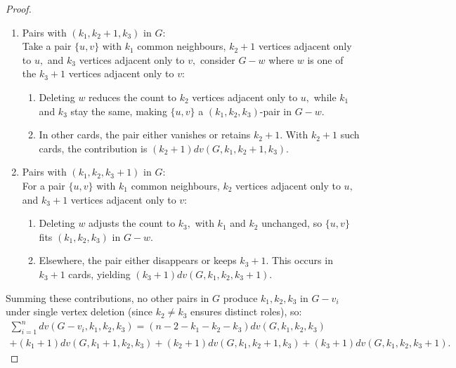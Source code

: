 \documentclass[11pt,oneside]{article}
\theoremstyle{definition}
\begin{document}
\begin{proof}
\begin{enumerate}
\item[(3)] Pairs with $(k_1,k_2+1,k_3)$ in $G$:\\
Take a pair $\{u,v\}$ with $k_1$ common neighbours, $k_2+1$ vertices adjacent only to $u,$ and $k_3$ vertices adjacent only to $v,$  consider $G-w$ where $w$ is one of the $k_3+1$ vertices adjacent only to $v:$
\begin{enumerate}
\item[{\bf \LARGE .}] Deleting $w$ reduces the count to $k_2$ vertices adjacent only to $u,$ while $k_1$ and $k_3$ stay the same, making  $\{u,v\}$ a $(k_1,k_2,k_3)$-pair in $G-w.$
\item[{\bf \LARGE .}] In other cards, the pair either vanishes or retains $k_2+1.$ With $k_2+1$ such cards, the contribution is $(k_2+1)dv(G, k_1,k_2+1,k_3).$
\end{enumerate}

\item[(4)] Pairs with $(k_1,k_2,k_3+1)$ in $G$:\\
For a pair $\{u,v\}$ with $k_1$ common neighbours, $k_2$ vertices adjacent only to $u,$ and $k_3+1$ vertices adjacent only to $v:$
\begin{enumerate}
\item[{\bf \LARGE .}] Deleting $w$ adjusts the count to $k_3,$ with $k_1$ and $k_2$ unchanged, so $\{u,v\}$ fits $(k_1,k_2,k_3)$ in $G-w.$
\item[{\bf \LARGE .}] Elsewhere, the pair either disappears or keeps $k_3+1.$ This occurs in $k_3+1$ cards, yielding $(k_3+1)dv(G, k_1,k_2,k_3+1).$
\end{enumerate}
\end{enumerate}
Summing these contributions, no other pairs in $G$ produce $k_1,k_2,k_3$ in $G-v_i$ under single vertex deletion (since $k_2 \neq k_3$ ensures distinct roles), so:
\begin{multline} \sum_{i=1}^{n}{dv(G-v_i,k_1,k_2,k_3)}=(n-2-k_1-k_2-k_3)dv(G,k_1,k_2,k_3)\\+(k_1+1)dv(G,k_1+1,k_2,k_3)
+(k_2+1)dv(G,k_1,k_2+1,k_3)+(k_3+1)dv(G,k_1,k_2,k_3+1). 
\end{multline}

\end{proof}
\end{document}
